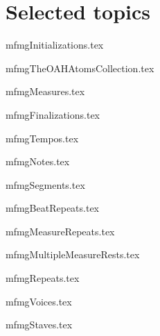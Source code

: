 



\part{Selected topics}


{mfmgInitializations.tex}



{mfmgTheOAHAtomsCollection.tex}



{mfmgMeasures.tex}

{mfmgFinalizations.tex}

{mfmgTempos.tex}

{mfmgNotes.tex}

{mfmgSegments.tex}

{mfmgBeatRepeats.tex}

{mfmgMeasureRepeats.tex}

{mfmgMultipleMeasureRests.tex}

{mfmgRepeats.tex}

{mfmgVoices.tex}

{mfmgStaves.tex}

